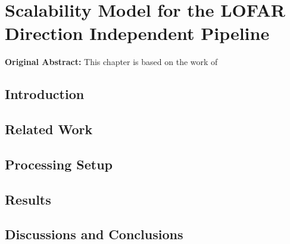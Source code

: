 \chapter{Scalability Model for the LOFAR Direction Independent Pipeline}\label{ch:Scalability_model}

\begin{tcolorbox}[colback=thesislight,colframe=thesismid,width=\dimexpr\textwidth+3mm\relax]
     \textbf{Original Abstract:}
     {\small
     }
This chapter is based on the work of  
\end{tcolorbox}


\section{\label{sec:ch6_intro}Introduction }


\section{Related Work}\label{sec:ch6_related}


\section{Processing Setup }\label{sec:ch6_methods}



\section{Results}\label{sec:ch6_results}


\section{Discussions and Conclusions}\label{sec:ch6_discussions}



